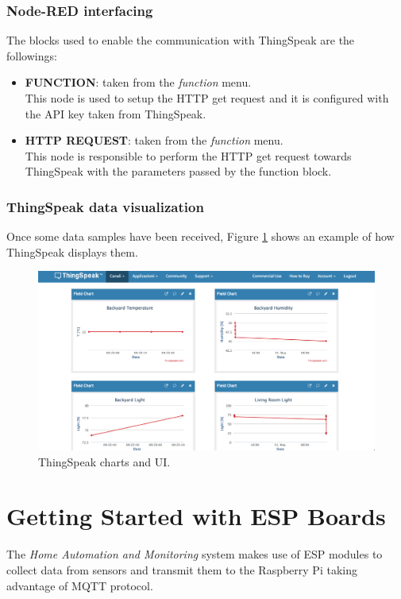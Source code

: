 \subsubsection{Node-RED interfacing}
The blocks used to enable the communication with ThingSpeak are the followings:

\begin{itemize}
    \item \textbf{FUNCTION}: taken from the \textit{function} menu. \\
    This node is used to setup the HTTP get request and it is configured with the API key taken from ThingSpeak.
    \item \textbf{HTTP REQUEST}: taken from the \textit{function} menu. \\
    This node is responsible to perform the HTTP get request towards ThingSpeak with the parameters passed by the function block.
\end{itemize}

\subsubsection{ThingSpeak data visualization}
Once some data samples have been received, Figure \ref{thingspeak_charts} shows an example of how ThingSpeak displays them.

\begin{figure}[H]
	\begin{center}
		\includegraphics[width=\textwidth]{./pictures/thingspeak-channel-charts}
		\caption{ThingSpeak charts and UI.}
		\label{thingspeak_charts}
	\end{center}
\end{figure}

\newpage
\section{Getting Started with ESP Boards}
The \textit{Home Automation and Monitoring} system makes use of ESP modules to collect data from sensors and transmit them to the Raspberry Pi taking advantage of MQTT protocol.

